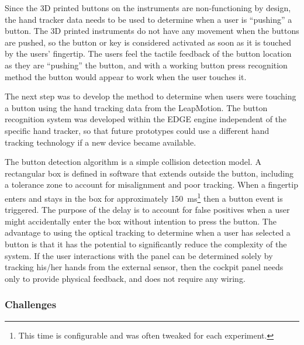 Since the 3D printed buttons on the instruments are non-functioning by design, the hand tracker data needs to be used to determine when a user is ``pushing'' a button.
The 3D printed instruments do not have any movement when the buttons are pushed, so the button or key is considered activated as soon as it is touched by the users' fingertip.
The users feel the tactile feedback of the button location as they are ``pushing'' the button, and with a working button press recognition method the button would appear to work when the user touches it.

The next step was to develop the method to determine when users were touching a button using the hand tracking data from the LeapMotion.
The button recognition system was developed within the EDGE engine independent of the specific hand tracker, so that future prototypes could use a different hand tracking technology if a new device became available.

The button detection algorithm is a simple collision detection model.
A rectangular box is defined in software that extends outside the button, including a tolerance zone to account for misalignment and poor tracking.
When a fingertip enters and stays in the box for approximately \SI{150}{\milli\second}\footnote{This time is configurable and was often tweaked for each experiment.} then a button event is triggered.
The purpose of the delay is to account for false positives when a user might accidentally enter the box without intention to press the button.
The advantage to using the optical tracking to determine when a user has selected a button is that it has the potential to significantly reduce the complexity of the system.
If the user interactions with the panel can be determined solely by tracking his/her hands from the external sensor, then the cockpit panel needs only to provide physical feedback, and does not require any wiring.

\subsubsection{Challenges}

